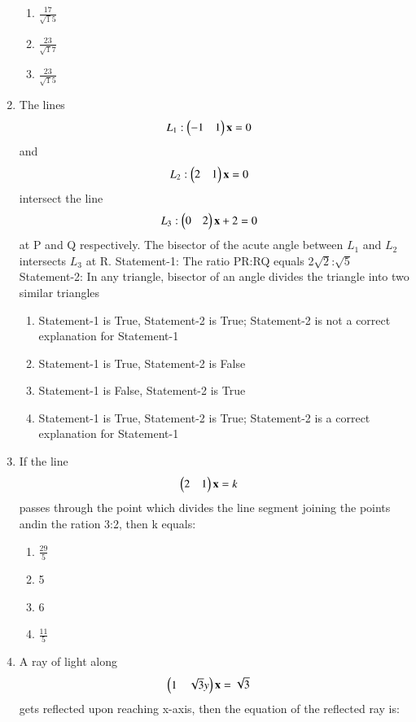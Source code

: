 \begin{enumerate}
\begin{enumerate}
     \item  $\frac{17}{\sqrt15}$
     \item $\frac{23}{\sqrt17}$
     \item  $\frac{23}{\sqrt15}$
     \end{enumerate}
    \item The lines \begin{align}L_1:\begin{pmatrix}-1 & 1\end{pmatrix}\mathbf{x} &= 0\end{align}  and \begin{align}L_2:\begin{pmatrix}2 & 1\end{pmatrix}\mathbf{x} &= 0\end{align} intersect the line \begin{align}L_3:\begin{pmatrix}0 & 2\end{pmatrix}\mathbf{x} + 2 &= 0\end{align} at P and Q respectively. The bisector of the acute angle between $L_1$ and $L_2$ intersects $L_3$ at R.
     Statement-1: The ratio PR:RQ equals 2$\sqrt2$:$\sqrt5$
     Statement-2: In any triangle, bisector of an angle divides the triangle into two similar triangles
     \begin{enumerate}
     \item  Statement-1 is True, Statement-2 is True; Statement-2 is not a correct explanation for Statement-1
     \item  Statement-1 is True, Statement-2 is False
     \item  Statement-1 is False, Statement-2 is True
     \item  Statement-1 is True, Statement-2 is True; Statement-2 is a correct explanation for Statement-1
     \end{enumerate}
    \item If the line \begin{align}\begin{pmatrix}2 & 1\end{pmatrix}\mathbf{x} &= k\end{align} passes through the point which divides the line segment joining the points andin the ration 3:2, then k equals:\\
    \begin{enumerate}
     \item $\frac{29}{5}$ 
     \item  5
     \item  6
     \item $\frac{11}{5}$\\
     \end{enumerate}
    \item A ray of light along \begin{align}\begin{pmatrix}1 & \sqrt3y\end{pmatrix}\mathbf{x} &= \sqrt3\end{align} gets reflected upon reaching x-axis, then the equation of the reflected ray is:\\

\end{enumerate}
